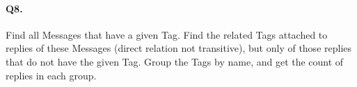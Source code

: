 \paragraph{Q8.}
Find all Messages that have a given Tag. Find the related Tags attached
to replies of these Messages (direct relation not transitive), but only
of those replies that do not have the given Tag.
Group the Tags by name, and get the count of replies in each group.
